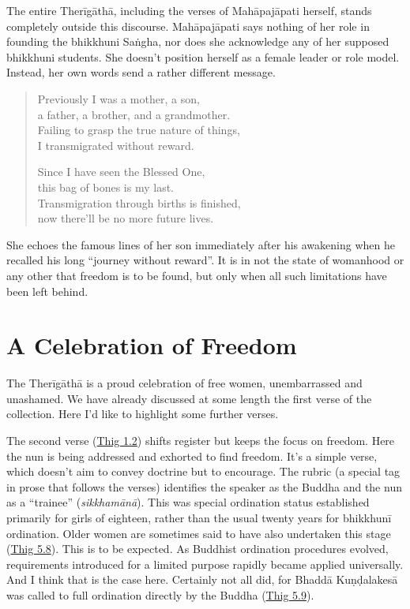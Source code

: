 \documentclass[12pt,openany]{book}%
\begin{document}
The entire \textsanskrit{Therīgāthā}, including the verses of \textsanskrit{Mahāpajāpati} herself, stands completely outside this discourse. \textsanskrit{Mahāpajāpati} says nothing of her role in founding the bhikkhuni \textsanskrit{Saṅgha}, nor does she acknowledge any of her supposed bhikkhuni students. She doesn’t position herself as a female leader or role model. Instead, her own words send a rather different message.

\begin{quotation}%
Previously I was a mother, a son, \\
a father, a brother, and a grandmother. \\
Failing to grasp the true nature of things, \\
I transmigrated without reward.

Since I have seen the Blessed One, \\
this bag of bones is my last. \\
Transmigration through births is finished, \\
now there’ll be no more future lives.

%
\end{quotation}

She echoes the famous lines of her son immediately after his awakening when he recalled his long “journey without reward”. It is in not the state of womanhood or any other that freedom is to be found, but only when all such limitations have been left behind.

\section*{A Celebration of Freedom}

The \textsanskrit{Therīgāthā} is a proud celebration of free women, unembarrassed and unashamed. We have already discussed at some length the first verse of the collection. Here I’d like to highlight some further verses.

The second verse (\href{https://suttacentral.net/thig1.2}{Thig 1.2}) shifts register but keeps the focus on freedom. Here the nun is being addressed and exhorted to find freedom. It’s a simple verse, which doesn’t aim to convey doctrine but to encourage. The rubric (a special tag in prose that follows the verses) identifies the speaker as the Buddha and the nun as a “trainee” (\textit{\textsanskrit{sikkhamānā}}). This was special ordination status established primarily for girls of eighteen, rather than the usual twenty years for \textsanskrit{bhikkhunī} ordination. Older women are sometimes said to have also undertaken this stage (\href{https://suttacentral.net/thig5.8}{Thig 5.8}). This is to be expected. As Buddhist ordination procedures evolved, requirements introduced for a limited purpose rapidly became applied universally. And I think that is the case here. Certainly not all did, for \textsanskrit{Bhaddā} \textsanskrit{Kuṇḍalakesā} was called to full ordination directly by the Buddha (\href{https://suttacentral.net/thig5.9}{Thig 5.9}).
\end{document}
